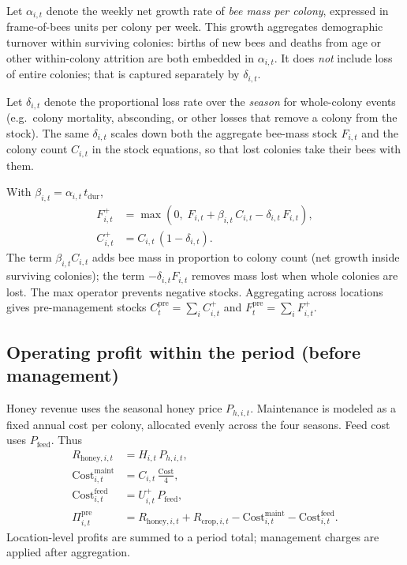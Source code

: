 \documentclass[11pt]{article}
\begin{document}
Let $\alpha_{i,t}$ denote the weekly net growth rate of \emph{bee mass per colony}, expressed in frame-of-bees units per colony per week. This growth aggregates demographic turnover within surviving colonies: births of new bees and deaths from age or other within-colony attrition are both embedded in $\alpha_{i,t}$. It does \emph{not} include loss of entire colonies; that is captured separately by $\delta_{i,t}$.

Let $\delta_{i,t}$ denote the proportional loss rate over the \emph{season} for whole-colony events (e.g.\ colony mortality, absconding, or other losses that remove a colony from the stock). The same $\delta_{i,t}$ scales down both the aggregate bee-mass stock $F_{i,t}$ and the colony count $C_{i,t}$ in the stock equations, so that lost colonies take their bees with them.

With $\beta_{i,t}=\alpha_{i,t}\, t_{\mathrm{dur}}$,
\begin{align}
F^+_{i,t} &= \max\!\left(0,\; F_{i,t} + \beta_{i,t}\, C_{i,t} - \delta_{i,t}\, F_{i,t}\right), \\
C^+_{i,t} &= C_{i,t}\,(1-\delta_{i,t}).
\end{align}
The term $\beta_{i,t} C_{i,t}$ adds bee mass in proportion to colony count (net growth inside surviving colonies); the term $-\delta_{i,t} F_{i,t}$ removes mass lost when whole colonies are lost. The max operator prevents negative stocks. Aggregating across locations gives pre-management stocks $C^{\mathrm{pre}}_t=\sum_i C^+_{i,t}$ and $F^{\mathrm{pre}}_t=\sum_i F^+_{i,t}$.

\subsection{Operating profit within the period (before management)}

Honey revenue uses the seasonal honey price $P_{h,i,t}$. Maintenance is modeled as a fixed annual cost per colony, allocated evenly across the four seasons. Feed cost uses $P_{\mathrm{feed}}$. Thus
\begin{align}
R_{\mathrm{honey},i,t} &= H_{i,t}\, P_{h,i,t}, \\
\mathrm{Cost}^{\mathrm{maint}}_{i,t} &= C_{i,t}\, \frac{\mathrm{Cost}}{4}, \\
\mathrm{Cost}^{\mathrm{feed}}_{i,t} &= U^+_{i,t}\, P_{\mathrm{feed}}, \\
\Pi^{\mathrm{pre}}_{i,t} &= R_{\mathrm{honey},i,t} + R_{\mathrm{crop},i,t} - \mathrm{Cost}^{\mathrm{maint}}_{i,t} - \mathrm{Cost}^{\mathrm{feed}}_{i,t}.
\end{align}
Location-level profits are summed to a period total; management charges are applied after aggregation.
\end{document}
